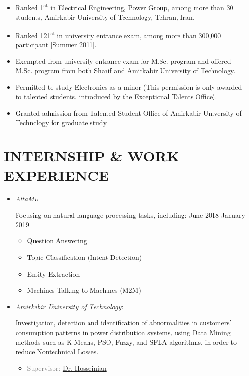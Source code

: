 \begin{itemize}
\item Ranked 1\textsuperscript{st} in Electrical Engineering, Power Group, among more than 30 students,
Amirkabir University of Technology, Tehran, Iran.

\item Ranked 121\textsuperscript{st} in university entrance exam, among more than 300,000
participant [Summer 2011].

\item Exempted from university entrance exam for M.Sc. program and offered M.Sc. program from both
Sharif and Amirkabir University of Technology.

\item Permitted to study Electronics as a minor (This permission is only awarded to talented students, introduced by the Exceptional Talents Office).

\item Granted admission from Talented Student Office of Amirkabir University of Technology for graduate study. \\
\end{itemize}

\vspace{-1 em}
\section{INTERNSHIP \& WORK EXPERIENCE}
\begin{itemize}
	
\item \href{http://altaml.com/}{ \emph{AltaML}}

Focusing on natural language processing tasks, including: \hfill June 2018-January 2019
\begin{itemize}
	\item Question Answering
	\item Topic Classification (Intent Detection)
	\item Entity Extraction
	\item Machines Talking to Machines (M2M)

\end{itemize}

\item \href{http://aut.ac.ir/aut/}{ \emph{Amirkabir University of Technology}}:

Investigation, detection and identification of abnormalities in customers' consumption patterns in power distribution systems, using Data Mining methods such as K-Means, PSO, Fuzzy, and SFLA algorithms, in order to reduce Nontechnical Losses.
\begin{itemize} 
\item\textcolor{gray}{Supervisor: \href{http://www.aut.ac.ir/official/main.asp?uid=hosseinian}{Dr. Hosseinian}} 
\end{itemize}
\end{itemize}

